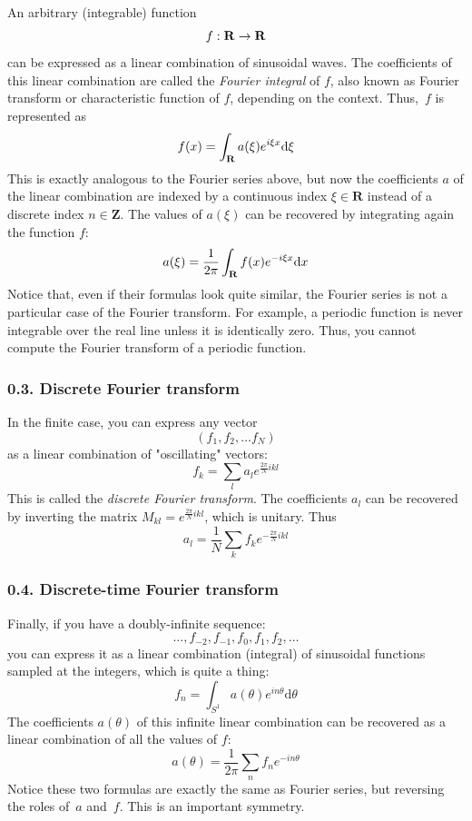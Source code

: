 An arbitrary (integrable) function
$$
f:\mathbf{R}\to\mathbf{R}
$$
can be expressed as a linear combination of sinusoidal waves.  The
coefficients of this linear combination are called the \emph{Fourier
integral} of $f$, also known as Fourier transform or characteristic
function of $f$, depending on the context.  Thus,~$f$ is represented
as
$$
f(x) = \int_{\mathbf{R}} a(\xi) e^{i\xi x} \mathrm{d} \xi
$$
This is exactly analogous to the Fourier series above, but now the coefficients
$a$ of the linear combination are indexed by a continuous index
$\xi\in\mathbf{R}$ instead of a discrete index $n\in\mathbf{Z}$.  The values
of $a(\xi)$ can be recovered by integrating again the function $f$:
$$
a(\xi) = \frac{1}{2\pi}\int_{\mathbf{R}} f(x) e^{-i\xi x} \mathrm{d} x
$$
Notice that, even if their formulas look quite similar, the Fourier
series is not a particular case of the Fourier transform.  For
example, a periodic function is never integrable over the real line
unless it is identically zero.  Thus, you cannot compute the Fourier
transform of a periodic function.



\subsubsection{0.3. Discrete Fourier transform}

In the finite case, you can express any vector
\begin{equation}
(f_1, f_2, \ldots f_N)
\end{equation}
as a linear combination of "oscillating" vectors:
\begin{equation}
f_k = \sum_l a_l e^{\frac{2\pi}{N}ikl}
\end{equation}
This is called the \emph{discrete Fourier transform}.
The coefficients $a_l$ can be recovered by inverting the matrix $M_{kl} =
e^{\frac{2\pi}{N}ikl}$, which is unitary.  Thus
$$
a_l = \frac{1}{N}\sum_k f_k e^{-\frac{2\pi}{N}ikl}
$$

\subsubsection{0.4. Discrete-time Fourier transform}

Finally, if you have a doubly-infinite sequence:
\begin{equation}
\ldots,f_{-2},f_{-1},f_0,f_1,f_2,\ldots
\end{equation}
you can express it as a linear combination (integral) of sinusoidal functions
sampled at the integers, which is quite a thing:
\begin{equation}
f_n = \int_{S^1} a(\theta) e^{in\theta}
\mathrm{d}\theta
\end{equation}
The coefficients $a(\theta)$ of this infinite linear combination can be
recovered as a linear combination of all the values of $f$:
\begin{equation}
	a(\theta) = \frac{1}{2\pi}\sum_n f_n e^{-in\theta}
\end{equation}
Notice these two formulas are exactly the same as Fourier series, but
reversing the roles of~$a$ and~$f$.
This is an important symmetry.



